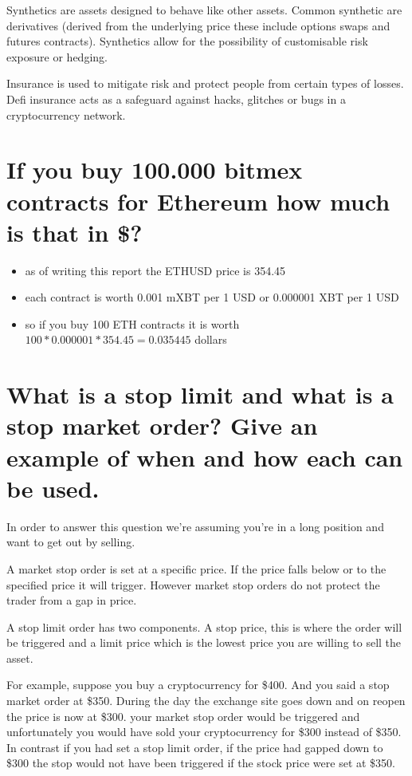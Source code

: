 Synthetics are assets designed to behave like other assets. Common synthetic are derivatives (derived from the underlying price these include options swaps and futures contracts).  Synthetics allow for the possibility of customisable risk exposure or hedging. 

Insurance is used to mitigate risk and protect people from certain types of losses. Defi insurance acts as a safeguard against hacks, glitches or bugs in a cryptocurrency network.

\section{ If you buy 100.000 bitmex contracts for Ethereum how much is that in \$?}

\begin{itemize}
\item as of writing this report the ETHUSD price is 354.45
\item each contract is worth 0.001 mXBT per 1 USD or 0.000001 XBT per 1 USD
\item so if you buy 100 ETH contracts it is worth $ 100 * 0.000001 *354.45 =0.035445 $ dollars
\end{itemize}

    
    
\section{ What is a stop limit and what is a stop market order? Give an example of when and how each can be used.}
    
    In order to answer this question we're assuming you're in a long position and want to get out by selling.

A market stop order is set at a specific price. If the price falls below or to the specified price it will trigger. However market stop orders do not protect the trader from a gap in price. 

A stop limit order has two components.  A stop price, this is where the order will be triggered and a limit price which is the lowest price you are willing to sell the asset. 

For example, suppose you buy a cryptocurrency for \$400. And you said a stop market order at \$350.  During the day the exchange site goes down  and on reopen the price is now at \$300.  your market stop order would be triggered and unfortunately you would have sold your cryptocurrency for \$300 instead of \$350.  In contrast if you had set a stop limit order,  if the price had gapped down to \$300 the stop would not have been triggered if the stock price were set at \$350. 
